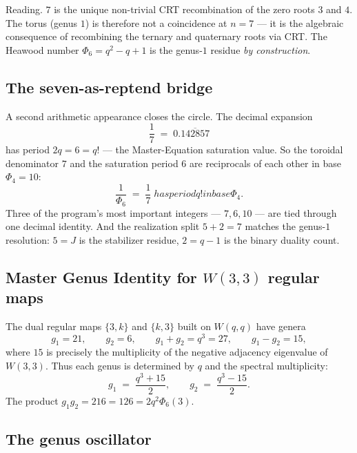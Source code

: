 \documentclass[11pt]{article}
\def\textbf#1{#1}%
\def\text#1{#1}%
\def\Phi#1{Phi#1}%
\def\cdot{ }%
\begin{document}
\noindent
\textbf{Reading.} $7$ is the unique non-trivial CRT recombination of the zero roots $3$ and $4$. The torus (genus $1$) is therefore not a coincidence at $n=7$ --- it is the algebraic consequence of recombining the ternary and quaternary roots via CRT. The Heawood number $\Phi_6 = q^2 - q + 1$ is the genus-$1$ residue \emph{by construction}.

\subsection*{The seven-as-reptend bridge}

A second arithmetic appearance closes the circle. The decimal expansion
\[
\frac{1}{7} \;=\; 0.\overline{142857}
\]
has period $2q = 6 = q!$ --- the Master-Equation saturation value. So the toroidal denominator $7$ and the saturation period $6$ are reciprocals of each other in base $\Phi_4 = 10$:
\[
\boxed{\;\frac{1}{\Phi_6} \;=\; \frac{1}{7} \;\text{has period } q! \text{ in base } \Phi_4.\;}
\]
Three of the program's most important integers --- $7, 6, 10$ --- are tied through one decimal identity. And the realization split $5 + 2 = 7$ matches the genus-$1$ resolution: $5 = J$ is the stabilizer residue, $2 = q-1$ is the binary duality count.

\subsection*{Master Genus Identity for $W(3,3)$ regular maps}

The dual regular maps $\{3, k\}$ and $\{k, 3\}$ built on $W(q,q)$ have genera
\[
g_1 = 21, \qquad g_2 = 6, \qquad g_1 + g_2 = q^3 = 27, \qquad g_1 - g_2 = 15,
\]
where $15$ is precisely the multiplicity of the negative adjacency eigenvalue of $W(3,3)$. Thus each genus is determined by $q$ and the spectral multiplicity:
\[
g_1 \;=\; \frac{q^3 + 15}{2}, \qquad g_2 \;=\; \frac{q^3 - 15}{2}.
\]
The product $g_1 \cdot g_2 = 21 \cdot 6 = 126 = 2q^2\Phi_6(3)$.

\subsection*{The genus oscillator}
\end{document}

